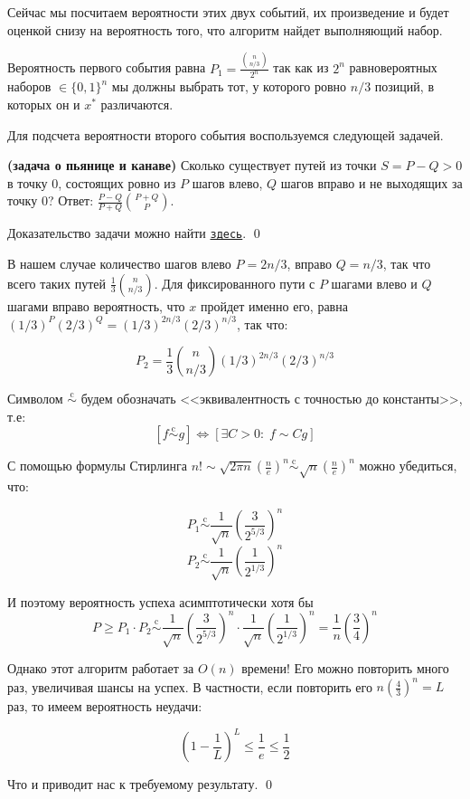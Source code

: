 Сейчас мы посчитаем вероятности этих двух событий, их произведение и будет оценкой снизу на вероятность того, что алгоритм найдет выполняющий набор.

Вероятность первого события равна $P_1 = \frac{{n\choose{n/3}}}{2^n}$ так как из $2^n$ равновероятных наборов $\in \{0, 1\}^n$ мы должны выбрать тот, у которого ровно $n/3$ позиций, в которых он и $x^*$ различаются. 

Для подсчета вероятности второго события воспользуемся следующей задачей.

\begin{theorem*}{\bfseries(задача о пьянице и канаве)}
Сколько существует путей из точки $S=P-Q>0$ в точку $0$, состоящих ровно из $P$ шагов влево, $Q$ шагов вправо и не выходящих за точку 0? Ответ: $\frac{P-Q}{P+Q} {P+Q\choose P}$.
\end{theorem*}
Доказательство задачи можно найти \href{https://drive.google.com/file/d/1KaZ5K6OAp6HiJGrxcBXQsNTa5yug4_FE/view?usp=sharing}{\texttt{здесь}}. \qed

В нашем случае количество шагов влево $P = 2n/3$, вправо $Q=n/3$, так что всего таких путей $\frac{1}{3}{n\choose n/3}$. Для фиксированного пути с $P$ шагами влево и $Q$ шагами вправо вероятность, что $x$ пройдет именно его, равна $(1/3)^P (2/3)^Q = (1/3)^{2n/3} (2/3)^{n/3}$, так что:

$$P_2 = \frac{1}{3} {n\choose n/3} (1/3)^{2n/3} (2/3)^{n/3}$$

\newcommand{\scm}{\overset{\text{c}}{\sim}}
Символом $\scm$ будем обозначать <<эквивалентность с точностью до константы>>, т.е: $$[f \scm g] \iff [\exists C > 0: \; f \sim Cg]$$

С помощью формулы Стирлинга $n! \sim \sqrt{2\pi n}\left(\frac{n}{e}\right)^n \scm \sqrt{n}\left(\frac{n}{e}\right)^n$ можно убедиться, что:

$$ P_1 \scm \frac{1}{\sqrt n}\left(\frac{3}{2^{5/3}}\right)^n$$
$$ P_2 \scm \frac{1}{\sqrt n}\left(\frac{1}{2^{1/3}}\right)^n$$

И поэтому вероятность успеха асимптотически хотя бы 
$$P \geq P_1 \cdot P_2 \scm \frac{1}{\sqrt n}\left(\frac{3}{2^{5/3}}\right)^n \cdot \frac{1}{\sqrt n}\left(\frac{1}{2^{1/3}}\right)^n = \frac{1}{n}\left(\frac{3}{4}\right)^n$$

Однако этот алгоритм работает за $O(n)$ времени! Его можно повторить много раз, увеличивая шансы на успех. В частности, если повторить его $n\left(\frac{4}{3}\right)^n = L$ раз, то имеем вероятность неудачи:

$$\left(1-\frac{1}{L}\right)^L \leq \frac{1}{e} \leq \frac{1}{2}$$

Что и приводит нас к требуемому результату. \qed

